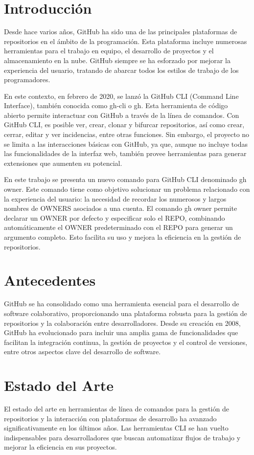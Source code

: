 \section{Introducción}
Desde hace varios años, GitHub ha sido una de las principales plataformas de repositorios en el ámbito de la programación. Esta plataforma incluye numerosas herramientas para el trabajo en equipo, el desarrollo de proyectos y el almacenamiento en la nube. GitHub siempre se ha esforzado por mejorar la experiencia del usuario, tratando de abarcar todos los estilos de trabajo de los programadores.

En este contexto, en febrero de 2020, se lanzó la GitHub CLI (Command Line Interface), también conocida como gh-cli o gh. Esta herramienta de código abierto permite interactuar con GitHub a través de la línea de comandos. Con GitHub CLI, es posible ver, crear, clonar y bifurcar repositorios, así como crear, cerrar, editar y ver incidencias, entre otras funciones. Sin embargo, el proyecto no se limita a las interacciones básicas con GitHub, ya que, aunque no incluye todas las funcionalidades de la interfaz web, también provee herramientas para generar extensiones que aumenten su potencial.

En este trabajo se presenta un nuevo comando para GitHub CLI denominado gh owner. Este comando tiene como objetivo solucionar un problema relacionado con la experiencia del usuario: la necesidad de recordar los numerosos y largos nombres de OWNERS asociados a una cuenta. El comando gh owner permite declarar un OWNER por defecto y especificar solo el REPO, combinando automáticamente el OWNER predeterminado con el REPO para generar un argumento completo. Esto facilita su uso y mejora la eficiencia en la gestión de repositorios.

\section{Antecedentes}
GitHub se ha consolidado como una herramienta esencial para el desarrollo de software colaborativo, proporcionando una plataforma robusta para la gestión de repositorios y la colaboración entre desarrolladores. Desde su creación en 2008, GitHub ha evolucionado para incluir una amplia gama de funcionalidades que facilitan la integración continua, la gestión de proyectos y el control de versiones, entre otros aspectos clave del desarrollo de software.

\section{Estado del Arte}
El estado del arte en herramientas de línea de comandos para la gestión de repositorios y la interacción con plataformas de desarrollo ha avanzado significativamente en los últimos años. Las herramientas CLI se han vuelto indispensables para desarrolladores que buscan automatizar flujos de trabajo y mejorar la eficiencia en sus proyectos.

